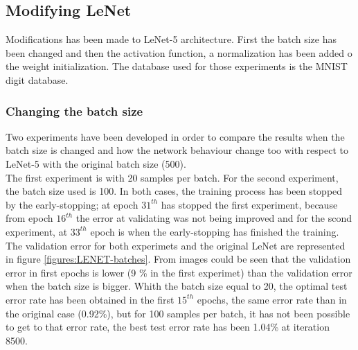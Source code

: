 


\subsection{Modifying LeNet}
Modifications has been made to LeNet-5 architecture. First the batch size has been changed and then the activation function, a normalization has been added o the weight initialization. The database used for those experiments is the MNIST digit database.\\

\subsubsection{Changing the batch size}
Two experiments have been developed in order to compare the results when the batch size is changed and how the network behaviour change too with respect to LeNet-5 with the original batch size (500).\\

The first experiment is with 20 samples per batch. For the second experiment, the batch size used is 100. In both cases, the training process has been stopped by the early-stopping; at epoch $31^{th}$ has stopped the first experiment, because from epoch $16^{th}$ the error at validating was not being improved and for the scond experiment, at $33^{th}$ epoch is when the early-stopping has finished the training.\\

The validation error for both experimets and the original LeNet are represented in figure \ref{figures:LENET-batches}. From images could be seen that the validation error in first epochs is lower (9 \% in the first experimet) than the validation error when the batch size is bigger. Whith the batch size equal to 20, the optimal test error rate has been obtained in the first $15^{th}$ epochs, the same error rate than in the original case (0.92\%), but for 100 samples per batch, it has not been possible to get to that error rate, the best test error rate has been 1.04\% at iteration 8500.\\

